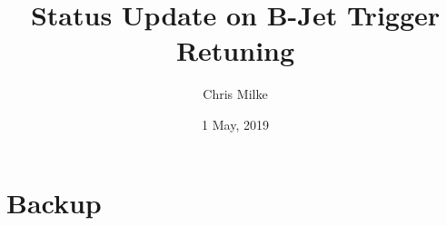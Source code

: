 \documentclass{beamer}
\begin{document}
\title{Status Update on B-Jet Trigger Retuning}   
\author{Chris Milke} 
\date{1 May, 2019} 

\frame{\titlepage} 





\section{Backup} 

\end{document}
